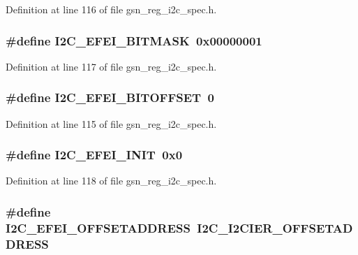 Definition at line 116 of file gsn\_\-reg\_\-i2c\_\-spec.h.

\hypertarget{a00558_a2aae738d3bec36e1dc2cae3ea35f94f6}{
\subsubsection[{I2C\_\-EFEI\_\-BITMASK}]{\setlength{\rightskip}{0pt plus 5cm}\#define I2C\_\-EFEI\_\-BITMASK~0x00000001}}
\label{a00558_a2aae738d3bec36e1dc2cae3ea35f94f6}


Definition at line 117 of file gsn\_\-reg\_\-i2c\_\-spec.h.

\hypertarget{a00558_a7841b90d672b820a8d871ed68157786d}{
\subsubsection[{I2C\_\-EFEI\_\-BITOFFSET}]{\setlength{\rightskip}{0pt plus 5cm}\#define I2C\_\-EFEI\_\-BITOFFSET~0}}
\label{a00558_a7841b90d672b820a8d871ed68157786d}


Definition at line 115 of file gsn\_\-reg\_\-i2c\_\-spec.h.

\hypertarget{a00558_aba537e1b8257355baccdaed35b040557}{
\subsubsection[{I2C\_\-EFEI\_\-INIT}]{\setlength{\rightskip}{0pt plus 5cm}\#define I2C\_\-EFEI\_\-INIT~0x0}}
\label{a00558_aba537e1b8257355baccdaed35b040557}


Definition at line 118 of file gsn\_\-reg\_\-i2c\_\-spec.h.

\hypertarget{a00558_a7ec20287609ad91f90af5f21c8203257}{
\subsubsection[{I2C\_\-EFEI\_\-OFFSETADDRESS}]{\setlength{\rightskip}{0pt plus 5cm}\#define I2C\_\-EFEI\_\-OFFSETADDRESS~I2C\_\-I2CIER\_\-OFFSETADDRESS}}
\label{a00558_a7ec20287609ad91f90af5f21c8203257}


